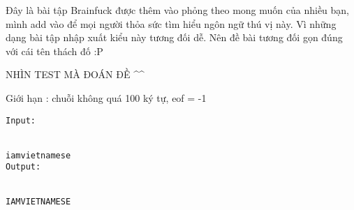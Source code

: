 



   Đây là bài tập Brainfuck được thêm vào phỏng theo mong muốn của nhiều bạn, mình add vào để mọi người thỏa sức tìm hiểu ngôn ngữ thú vị này.  Vì những dạng bài tập nhập xuất kiểu này tương đối dễ. Nên đề bài tương đối gọn đúng với cái tên thách đố :P  

       NHÌN TEST MÀ ĐOÁN ĐỀ \textasciicircum\textasciicircum     

   Giới hạn : chuỗi không quá 100 ký tự, eof = -1  
\begin{verbatim}
Input:


iamvietnamese
Output:


IAMVIETNAMESE\end{verbatim}